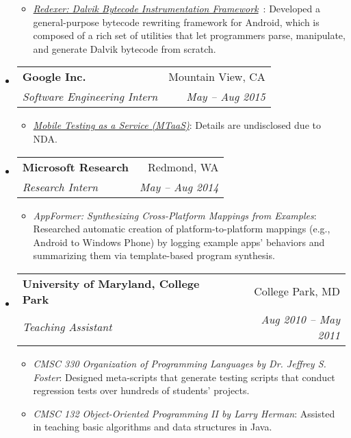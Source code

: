 \documentclass[letterpaper,11pt]{article}
\makeatletter
\newcommand{\ressubheading}[4]{
\begin{tabular*}{6.5in}{l@{\extracolsep{\fill}}r}
    \textbf{#1} & #2 \\
    \textit{#3} & \textit{#4} \\
\end{tabular*}\vspace{-6pt}}
\makeatother
\begin{document}
\begin{itemize}
{\begin{itemize}
\item\emph{\href{https://github.com/plum-umd/redexer}{Redexer: Dalvik Bytecode Instrumentation Framework}}~\cite{spsm12, drandroid, acplib}:
Developed a general-purpose bytecode rewriting framework for Android,
which is composed of a rich set of utilities that let programmers
parse, manipulate, and generate Dalvik bytecode from scratch.
        \end{itemize}
        }
    \item
      \ressubheading{{Google Inc.}}{Mountain View, CA}{Software Engineering Intern}{May -- Aug 2015}
        {
\small
        \begin{itemize}
\item\emph{\href{https://developers.google.com/cloud-test-lab/}{Mobile Testing as a Service (MTaaS)}}:
Details are undisclosed due to NDA.
        \end{itemize}
        }
    \item
      \ressubheading{{Microsoft Research}}{Redmond, WA}{Research Intern}{May -- Aug 2014}
        {
\small
        \begin{itemize}
\item\emph{AppFormer: Synthesizing Cross-Platform Mappings from Examples}:
Researched automatic creation of platform-to-platform mappings
(e.g., Android to Windows Phone) by logging example apps' behaviors and
summarizing them via template-based program synthesis.
        \end{itemize}
        }
    \item
      \ressubheading{{University of Maryland, College Park}}{College Park, MD}{Teaching Assistant}{Aug 2010 -- May 2011}
        {
\small
        \begin{itemize}
\item\emph{CMSC 330 Organization of Programming Languages by Dr. Jeffrey S. Foster}:
Designed meta-scripts that generate testing scripts
that conduct regression tests over hundreds of students' projects.
\item\emph{CMSC 132 Object-Oriented Programming II by Larry Herman}:
Assisted in teaching basic algorithms and data structures in Java.
        \end{itemize}
        }


\end{itemize}
\end{document}
